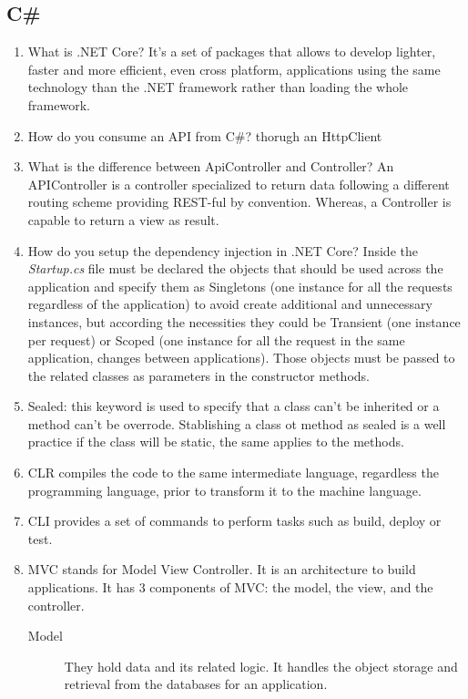 \subsection{C\#}
\begin{multicols}{2}
\begin{enumerate}
\item What is .NET Core? It's a set of packages that allows to develop lighter, faster and more efficient, even cross platform, applications using the same technology than the .NET framework rather than loading the whole framework.
\item How do you consume an API from C\#? thorugh an HttpClient
\item What is the difference between ApiController and Controller? An APIController is a controller specialized to return data following a different routing scheme providing REST-ful by convention. Whereas, a Controller is capable to return a view as result.
\item How do you setup the dependency injection in .NET Core? Inside the \emph{Startup.cs} file must be declared the objects that should be used across the application and specify them as Singletons (one instance for all the requests regardless of the application) to avoid create additional and unnecessary instances, but according the necessities they could be Transient (one instance per request) or Scoped (one instance for all the request in the same application, changes between applications). Those objects must be passed to the related classes as parameters in the constructor methods.
\item Sealed: this keyword is used to specify that a class can't be inherited or a method can't be overrode. Stablishing a class ot method as sealed is a well practice if the class will be static, the same applies to the methods.
\item CLR compiles the code to the same intermediate language, regardless the programming language, prior to transform it to the machine language.
\item CLI provides a set of commands to perform tasks such as build, deploy or test.
\item MVC stands for Model View Controller. It is an architecture to build applications. It has 3 components of MVC: the model, the view, and the controller.
\begin{description}
\item[Model] They hold data and its related logic. It handles the object storage and retrieval from the databases for an application. 

\end{description}
\end{enumerate}
\end{multicols}
